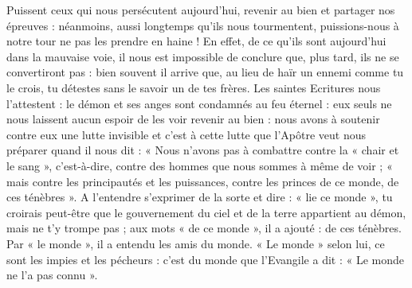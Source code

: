  Puissent ceux qui nous persécutent aujourd’hui, revenir au bien et partager nos épreuves : néanmoins, aussi longtemps qu’ils nous tourmentent, puissions-nous à notre tour ne pas les prendre en haine ! En effet, de ce qu’ils sont aujourd’hui dans la mauvaise voie, il nous est impossible de conclure que, plus tard, ils ne se convertiront pas : bien souvent il arrive que, au lieu de haïr un ennemi comme tu le crois, tu détestes sans le savoir un de tes frères. Les saintes Ecritures nous l’attestent : le démon et ses anges sont condamnés au feu éternel : eux seuls ne nous laissent aucun espoir de les voir revenir au bien : nous avons à soutenir contre eux une lutte invisible et c’est à cette lutte que l’Apôtre veut nous préparer quand il nous dit : « Nous n’avons pas à combattre contre la « chair et le sang », c’est-à-dire, contre des hommes que nous sommes à même de voir ; « mais contre les principautés et les puissances, contre les princes de ce monde, de ces ténèbres ». A l’entendre s’exprimer de la sorte et dire : « lie ce monde », tu croirais peut-être que le gouvernement du ciel et de la terre appartient au démon, mais ne t’y trompe pas ; aux mots « de ce monde », il a ajouté : de ces ténèbres. Par « le monde », il a entendu les amis du monde. « Le monde » selon lui, ce sont les impies et les pécheurs : c’est du monde que l’Evangile a dit : « Le monde ne l’a pas connu ».